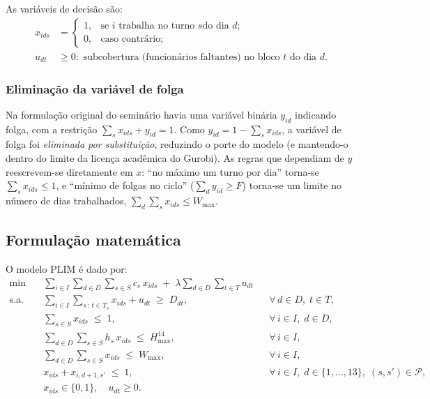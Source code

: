 \documentclass[12pt,a4paper]{article}
\begin{document}
As variáveis de decisão são:
\begin{align*}
x_{ids} &= \begin{cases} 1, & \text{se } i \text{ trabalha no turno } s \text{
do dia } d;\\ 0, & \text{caso contrário;}\end{cases}\\
u_{dt} &\ge 0: \text{ subcobertura (funcionários faltantes) no bloco } t
\text{ do dia } d.
\end{align*}

\subsubsection*{Eliminação da variável de folga}

Na formulação original do seminário havia uma variável binária $y_{id}$
indicando folga, com a restrição $\sum_s x_{ids} + y_{id} = 1$. Como
$y_{id} = 1 - \sum_s x_{ids}$, a variável de folga foi \emph{eliminada por
substituição}, reduzindo o porte do modelo (e mantendo-o dentro do limite da
licença acadêmica do Gurobi). As regras que dependiam de $y$ reescrevem-se
diretamente em $x$: ``no máximo um turno por dia'' torna-se $\sum_s x_{ids}
\le 1$, e ``mínimo de folgas no ciclo'' ($\sum_d y_{id} \ge F$) torna-se um
limite no número de dias trabalhados, $\sum_d \sum_s x_{ids} \le W_{\max}$.

\subsection{Formulação matemática}

O modelo PLIM é dado por:
\begin{align}
\min \quad & \sum_{i \in I} \sum_{d \in D} \sum_{s \in S} c_s\, x_{ids}
\;+\; \lambda \sum_{d \in D} \sum_{t \in T} u_{dt} \label{eq:fo}\\[4pt]
\text{s.a.} \quad
& \sum_{i \in I} \sum_{s \,:\, t \in T_s} x_{ids} + u_{dt} \;\ge\; D_{dt},
&& \forall\, d \in D,\; t \in T, \label{eq:r1}\\
& \sum_{s \in S} x_{ids} \;\le\; 1,
&& \forall\, i \in I,\; d \in D, \label{eq:r2}\\
& \sum_{d \in D} \sum_{s \in S} h_s\, x_{ids} \;\le\; H_{\max}^{14},
&& \forall\, i \in I, \label{eq:r3}\\
& \sum_{d \in D} \sum_{s \in S} x_{ids} \;\le\; W_{\max},
&& \forall\, i \in I, \label{eq:r4}\\
& x_{ids} + x_{i,d+1,s'} \;\le\; 1,
&& \forall\, i \in I,\; d \in \{1,\dots,13\},\; (s,s') \in \mathcal{P},
\label{eq:r5}\\
& x_{ids} \in \{0,1\}, \quad u_{dt} \ge 0.
&& \label{eq:dom}
\end{align}
\end{document}
